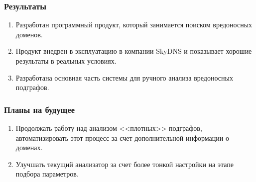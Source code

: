 \documentclass[12pt,pdf,hyperref={unicode}]{beamer}
\begin{document}
\begin{frame}
\frametitle{Результаты}
\begin{enumerate}
	\item Разработан программный продукт, который занимается поиском вредоносных доменов.
	\item Продукт внедрен в эксплуатацию в компании SkyDNS и показывает хорошие результаты в реальных условиях.
	\item Разработана основная часть системы для ручного анализа вредоносных подграфов.
\end{enumerate}
\end{frame}

\begin{frame}
\frametitle{Планы на будущее}
\begin{enumerate}
	\item Продолжать работу над анализом <<плотных>> подграфов, автоматизировать этот процесс за счет дополнительной информации о доменах.
	\item Улучшать текущий анализатор за счет более тонкой настройки на этапе подбора параметров.
	
\end{enumerate}
\end{frame}
\end{document}
